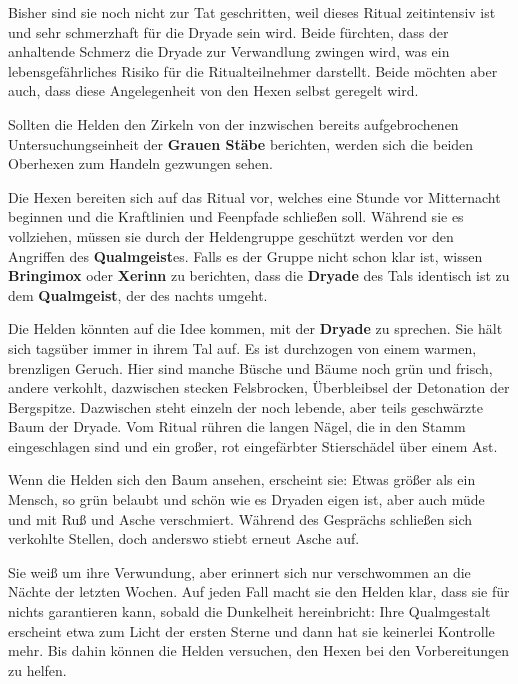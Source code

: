 Bisher sind sie noch nicht zur Tat geschritten, weil dieses Ritual zeitintensiv ist und sehr schmerzhaft für die Dryade sein wird.
Beide fürchten, dass der anhaltende Schmerz die Dryade zur Verwandlung zwingen wird, was ein lebensgefährliches Risiko für die Ritualteilnehmer darstellt.
Beide möchten aber auch, dass diese Angelegenheit von den Hexen selbst geregelt wird.

Sollten die Helden den Zirkeln von der inzwischen bereits aufgebrochenen Untersuchungseinheit der \textbf{Grauen Stäbe} berichten, werden sich die beiden Oberhexen zum Handeln gezwungen sehen.
\spaltenende





\newpage
\spaltenanfang
{}
Die Hexen bereiten sich auf das Ritual vor, welches eine Stunde vor Mitternacht beginnen und die Kraftlinien und Feenpfade schließen soll.
Während sie es vollziehen, müssen sie durch der Heldengruppe geschützt werden vor den Angriffen des \textbf{Qualmgeist}es.
Falls es der Gruppe nicht schon klar ist, wissen \textbf{Bringimox} oder \textbf{Xerinn} zu berichten,
dass die \textbf{Dryade} des Tals identisch ist zu dem \textbf{Qualmgeist}, der des nachts umgeht.


Die Helden könnten auf die Idee kommen, mit der \textbf{Dryade} zu sprechen.
Sie hält sich tagsüber immer in ihrem Tal auf.
Es ist durchzogen von einem warmen, brenzligen Geruch.
Hier sind manche Büsche und Bäume noch grün und frisch, andere verkohlt, dazwischen stecken Felsbrocken, Überbleibsel der Detonation der Bergspitze.
Dazwischen steht einzeln der noch lebende, aber teils geschwärzte Baum der Dryade.
Vom Ritual rühren die langen Nägel, die in den Stamm eingeschlagen sind und ein großer, rot eingefärbter Stierschädel über einem Ast.

Wenn die Helden sich den Baum ansehen, erscheint sie:
Etwas größer als ein Mensch, so grün belaubt und schön wie es Dryaden eigen ist, aber auch müde und mit Ruß und Asche verschmiert.
Während des Gesprächs schließen sich verkohlte Stellen, doch anderswo stiebt erneut Asche auf.


Sie weiß um ihre Verwundung, aber erinnert sich nur verschwommen an die Nächte der letzten Wochen.
Auf jeden Fall macht sie den Helden klar, dass sie für nichts garantieren kann, sobald die Dunkelheit hereinbricht:
Ihre Qualmgestalt erscheint etwa zum Licht der ersten Sterne und dann hat sie keinerlei Kontrolle mehr.
Bis dahin können die Helden versuchen, den Hexen bei den Vorbereitungen zu helfen.


